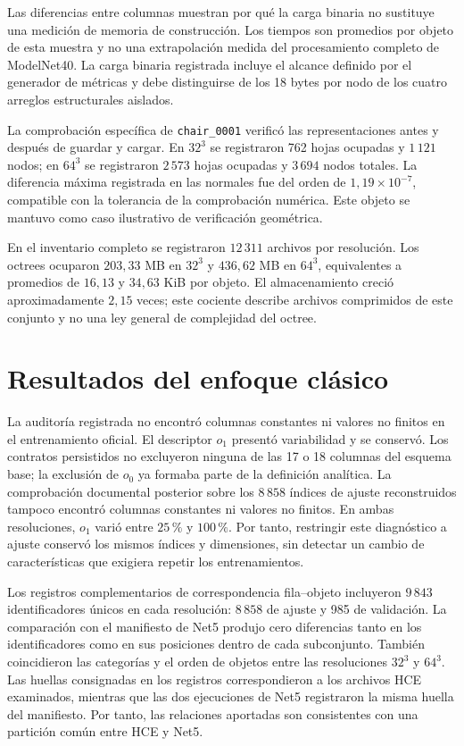 Las diferencias entre columnas muestran por qué la carga binaria no sustituye una medición de memoria de construcción. Los tiempos son promedios por objeto de esta muestra y no una extrapolación medida del procesamiento completo de ModelNet40. La carga binaria registrada incluye el alcance definido por el generador de métricas y debe distinguirse de los 18 bytes por nodo de los cuatro arreglos estructurales aislados.

La comprobación específica de \texttt{chair\_0001} verificó las representaciones antes y después de guardar y cargar. En $32^3$ se registraron 762 hojas ocupadas y $1\,121$ nodos; en $64^3$ se registraron $2\,573$ hojas ocupadas y $3\,694$ nodos totales. La diferencia máxima registrada en las normales fue del orden de $1{,}19\times10^{-7}$, compatible con la tolerancia de la comprobación numérica. Este objeto se mantuvo como caso ilustrativo de verificación geométrica.

En el inventario completo se registraron $12\,311$ archivos por resolución. Los octrees ocuparon $203{,}33$ MB en $32^3$ y $436{,}62$ MB en $64^3$, equivalentes a promedios de $16{,}13$ y $34{,}63$ KiB por objeto. El almacenamiento creció aproximadamente $2{,}15$ veces; este cociente describe archivos comprimidos de este conjunto y no una ley general de complejidad del octree.

\section{Resultados del enfoque clásico}
\label{sec:resultados-hce}
La auditoría registrada no encontró columnas constantes ni valores no finitos en el entrenamiento oficial. El descriptor $o_1$ presentó variabilidad y se conservó. Los contratos persistidos no excluyeron ninguna de las 17 o 18 columnas del esquema base; la exclusión de $o_0$ ya formaba parte de la definición analítica. La comprobación documental posterior sobre los $8\,858$ índices de ajuste reconstruidos tampoco encontró columnas constantes ni valores no finitos. En ambas resoluciones, $o_1$ varió entre $25\,\%$ y $100\,\%$. Por tanto, restringir este diagnóstico a ajuste conservó los mismos índices y dimensiones, sin detectar un cambio de características que exigiera repetir los entrenamientos.

Los registros complementarios de correspondencia fila--objeto incluyeron $9\,843$ identificadores únicos en cada resolución: $8\,858$ de ajuste y 985 de validación. La comparación con el manifiesto de Net5 produjo cero diferencias tanto en los identificadores como en sus posiciones dentro de cada subconjunto. También coincidieron las categorías y el orden de objetos entre las resoluciones $32^3$ y $64^3$. Las huellas consignadas en los registros correspondieron a los archivos HCE examinados, mientras que las dos ejecuciones de Net5 registraron la misma huella del manifiesto. Por tanto, las relaciones aportadas son consistentes con una partición común entre HCE y Net5.

